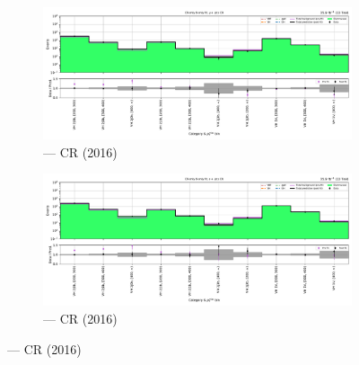 \begin{figure}[htbp]
    \centering
    \begin{subfigure}[b]{0.49\textwidth}
        \includegraphics[width=\textwidth]{chapters/higgstoinv/figures/mountain_ranges/2016/VH/Wmunu_tree_fit_b-abs_values_VH_cats.pdf}
        \caption{\VH --- \singleMuCr \gls{CR} (2016)}
    \end{subfigure}
    \hfill
    \begin{subfigure}[b]{0.49\textwidth}
        \includegraphics[width=\textwidth]{chapters/higgstoinv/figures/mountain_ranges/2016/VH/Wenu_tree_fit_b-abs_values_VH_cats.pdf}
        \caption{\VH --- \singleEleCr \gls{CR} (2016)}
    \end{subfigure}


\end{figure}
